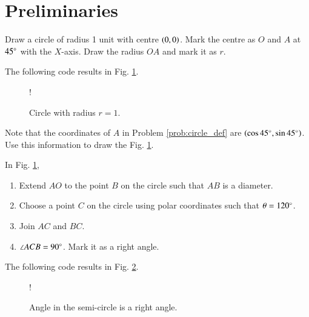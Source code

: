 \documentclass[journal,12pt,twocolumn]{IEEEtran}
\begin{document}
\section{Preliminaries}
\begin{problem}
\label{prob:circle_def}
Draw a circle of radius 1 unit with centre $\left(0,0\right)$.  Mark the centre as $O$ and $A$ at $45 \degree$ with the $X$-axis.  Draw the radius $OA$ and mark it as $r$.
\end{problem}
\solution The following code results in Fig. \ref{fig:circle_def}.

\begin{figure}[!h]
\centering
\resizebox {\columnwidth} {!} {

}
\caption{Circle with radius $r=1$.}
\label{fig:circle_def}
\end{figure}
%
\begin{problem}
Note that the coordinates of $A$ in Problem \ref{prob:circle_def} are $\left(\cos 45 \degree, \sin 45 \degree\right)$.  Use this information to draw the Fig. \ref{fig:circle_def}.
\end{problem}
%
\begin{problem}
In Fig. \ref{fig:circle_def}, 
\begin{enumerate}
\item Extend $AO$ to the point $B$ on the circle such that $AB$ is a diameter.
\item Choose a point $C$ on the circle using polar coordinates such that $\theta = 120 \degree$.  
\item Join $AC$ and $BC$.  
\item $\angle ACB = 90 \degree$.  Mark it as a right angle.
\end{enumerate}

\end{problem}
\solution The following code results in Fig. \ref{fig:semi_circle_def}.

\begin{figure}[!h]
\centering
\resizebox {\columnwidth} {!} {

}
\caption{Angle in the semi-circle is a right angle.}
\label{fig:semi_circle_def}
\end{figure}
\end{document}
